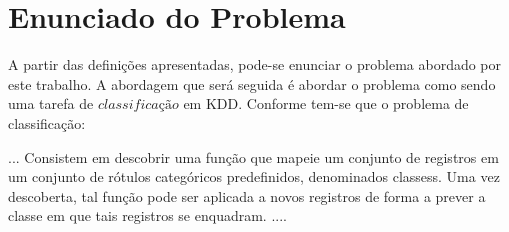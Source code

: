 \section{Enunciado do Problema}

A partir das definições apresentadas, pode-se enunciar o problema 
abordado por este trabalho. A abordagem que será seguida é abordar
o problema como sendo uma tarefa de $classificação$ em KDD. Conforme
\cite{passos2005datamining} tem-se que o problema de classificação:
\begin{description}
  \item ... Consistem em descobrir uma função que mapeie um conjunto de
  registros em um conjunto de rótulos categóricos predefinidos, denominados
  classess. Uma vez descoberta, tal função pode ser aplicada a novos registros
  de forma a prever a classe em que tais registros se enquadram. ....
\end{description}

